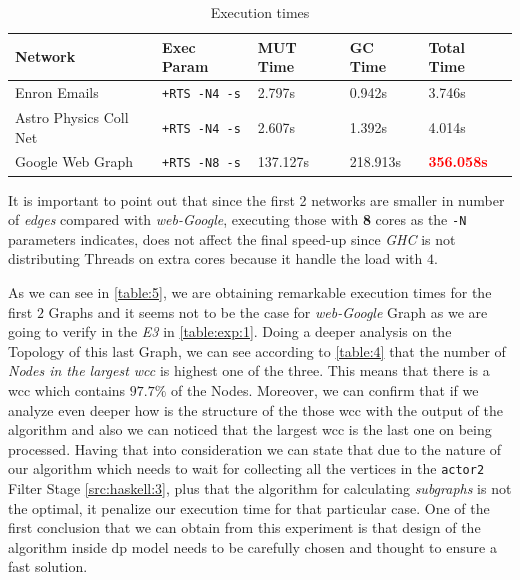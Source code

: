 \documentclass[preprint]{elsarticle}
\begin{document}
\begin{table}[H]
  \centering
  \begin{tabular}{|l|l|l|l|l|}
   \hline
   \textbf{Network} & \textbf{Exec Param} & \textbf{MUT Time} & \textbf{GC Time} & \textbf{Total Time}\\
   \hline
   Enron Emails & \texttt{+RTS -N4 -s} & 2.797s & 0.942s & 3.746s \\
   \hline
   Astro Physics Coll Net & \texttt{+RTS -N4 -s} & 2.607s & 1.392s & 4.014s \\
   \hline
   Google Web Graph & \texttt{+RTS -N8 -s} & 137.127s & 218.913s & \textbf{\textcolor{red}{356.058s}} \\
   \hline
  \end{tabular}
 \caption{Execution times}
 \label{table:5}
 \end{table}

It is important to point out that since the first 2 networks are smaller in number of \emph{edges} compared with \emph{web-Google}, executing those with \textbf{8} cores as the \texttt{-N} parameters indicates, does not affect the final speed-up since \emph{GHC} is not distributing Threads on extra cores because it handle the load with $4$.

As we can see in \autoref{table:5}, we are obtaining remarkable execution times for the first $2$ Graphs and it seems not to be the case for \textit{web-Google} Graph as we are going to verify in the \emph{E3} in \autoref{table:exp:1}.
Doing a deeper analysis on the Topology of this last Graph, we can see according to \autoref{table:4} that the number of \textit{Nodes in the largest \acrshort{wcc}} is highest one of the three. This means that there is a \acrshort{wcc} which contains $97.7\%$ of the Nodes. Moreover, we can confirm that if we analyze even deeper how is the structure of the those \acrshort{wcc} with the output of the algorithm and also we can noticed that the largest \acrshort{wcc} is the last one on being processed. Having that into consideration we can state that due to the nature of our algorithm which needs to wait for collecting all the vertices in the \texttt{actor2} Filter Stage \autoref{src:haskell:3}, plus that the algorithm for calculating \emph{subgraphs} is not the  optimal, it penalize our execution time for that particular case. One of the first conclusion that we can obtain from this experiment is that design of the algorithm inside \acrshort{dp} model needs to be carefully chosen and thought to ensure a fast solution. 
\end{document}
